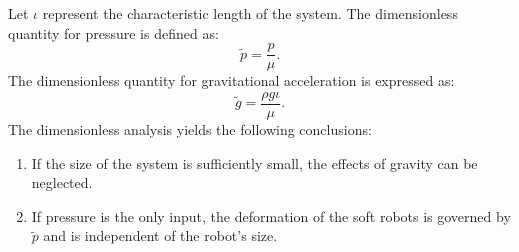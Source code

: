 \documentclass[journal]{IEEEtran}
\theoremstyle{definition}
\begin{document}
Let \( \iota \) represent the characteristic length of the system. The dimensionless quantity for pressure is defined as:
\begin{equation}
  \tilde{p} = \frac{p}{\mu}.
\end{equation}
The dimensionless quantity for gravitational acceleration is expressed as:
\begin{equation}
  \tilde{g} = \frac{\rho g \iota}{\mu}.
\end{equation}
The dimensionless analysis yields the following conclusions:
\begin{enumerate}
  \item If the size of the system is sufficiently small, the effects of gravity can be neglected.
  \item If pressure is the only input, the deformation of the soft robots is governed by \( \tilde{p} \) and is independent of the robot's size.
\end{enumerate}



\end{document}
